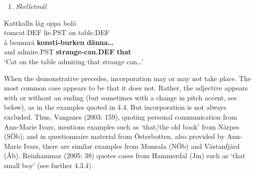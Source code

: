 \begin{enumerate} %
\item 
\textit{Skelletmål}
\end{enumerate} %
\ea\label{}
\gll Kattkalln  låg  oppa  bolä\\


tomcat.DEF  lie.PST  on  table.DEF\\ %


\ea\label{}
\gll å  beunnrä  \textbf{konsti-burken}\textbf{  dänna…}\\


and  admire.PST  \textbf{strange-can.DEF} \textbf{that}\\ %


‘Cat on the table admiring that strange can…’
\z


When the demonstrative precedes, incorporation may or may not take place. The most common case appears to be that it does not. Rather, the adjective appears with or without an ending (but sometimes with a change in pitch accent, see below), as in the examples quoted in 4.4. But incorporation is not always excluded. Thus, Vangsnes (2003: 159), quoting personal communication from Ann-Marie Ivars, mentions examples such as ‘that/the old book’ from Närpes (SÖb); and in questionnaire material from Österbotten, also provided by Ann-Marie Ivars, there are similar examples from Munsala (NÖb) and Västanfjärd (Åb). Reinhammar (2005: 38) quotes cases from Hammerdal (Jm) such as ‘that small boy’ (see further 4.3.4).

